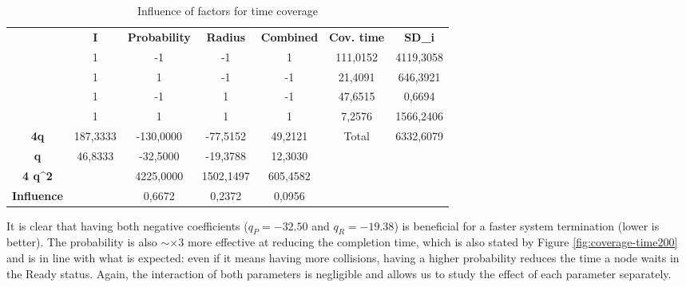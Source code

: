 \begin{table}[H]
\centering
\begin{tabular}{c|c|c|c|c|cc}
\cline{2-7}
 & \textbf{I} & \textbf{Probability} & \textbf{Radius} & \textbf{Combined} & \multicolumn{1}{c|}{\textbf{Cov. time}} & \multicolumn{1}{c|}{\textbf{SD\_i}} \\ \cline{2-7} 
 & 1 & -1 & -1 & 1 & \multicolumn{1}{c|}{111,0152} & \multicolumn{1}{c|}{4119,3058} \\ \cline{2-7} 
 & 1 & 1 & -1 & -1 & \multicolumn{1}{c|}{21,4091} & \multicolumn{1}{c|}{646,3921} \\ \cline{2-7} 
 & 1 & -1 & 1 & -1 & \multicolumn{1}{c|}{47,6515} & \multicolumn{1}{c|}{0,6694} \\ \cline{2-7} 
 & 1 & 1 & 1 & 1 & \multicolumn{1}{c|}{7,2576} & \multicolumn{1}{c|}{1566,2406} \\ \hline
\multicolumn{1}{|c|}{\textbf{4q}} & 187,3333 & -130,0000 & -77,5152 & 49,2121 & \multicolumn{1}{c|}{Total} & \multicolumn{1}{c|}{6332,6079} \\ \hline
\multicolumn{1}{|c|}{\textbf{q}} & 46,8333 & -32,5000 & -19,3788 & 12,3030 &  &  \\ \cline{1-5}
\multicolumn{1}{|c|}{\textbf{4 q\textasciicircum{}2}} &  & 4225,0000 & 1502,1497 & 605,4582 &  &  \\ \cline{1-5}
\multicolumn{1}{|c|}{\textbf{Influence}} &  & 0,6672 & 0,2372 & 0,0956 &  &  \\ \cline{1-5}
\end{tabular}
\caption{Influence of factors for time coverage}
\label{tab:influence-on-time-coverage}
\end{table}

It is clear that having both negative coefficients ($q_P = -32.50$ and $q_R = -19.38$) is beneficial for a faster system termination (lower is better). The probability is also $\sim\times 3$ more effective at reducing the completion time, which is also stated by Figure \ref{fig:coverage-time200} and is in line with what is expected: even if it means having more collisions, having a higher probability reduces the time a node waits in the Ready status. Again, the interaction of both parameters is negligible and allows us to study the effect of each parameter separately.
